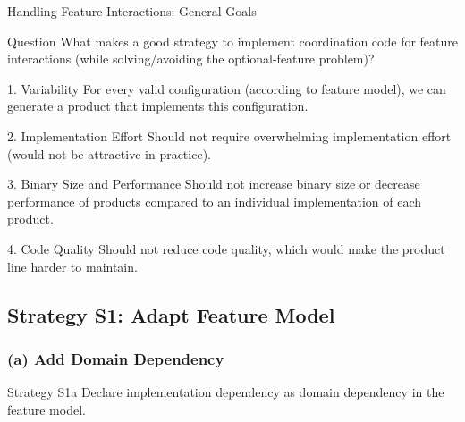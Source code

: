 \begin{frame}{Handling Feature Interactions: General Goals}
	\begin{note}{Question}
		What makes a good strategy to implement coordination code for feature interactions (while solving/avoiding the optional-feature problem)?
	\end{note}
	\pause
	\begin{fancycolumns}[animation=none]
		\begin{definition}{1. Variability}
			For every valid configuration (according to feature model), we can generate a product that implements this configuration.
		\end{definition}
		\pause
		\begin{definition}{2. Implementation Effort}
			Should not require overwhelming implementation effort (would not be attractive in practice).
		\end{definition}
		\pause
	\nextcolumn
		\begin{definition}{3. Binary Size and Performance}
			Should not increase binary size or decrease performance of products compared to an individual implementation of each product.
		\end{definition}
		\pause
		\begin{definition}{4. Code Quality}
			Should not reduce code quality, which would make the product line harder to maintain. 
		\end{definition}
	\end{fancycolumns}
\end{frame}

\subsection{Strategy S1: Adapt Feature Model}

\subsubsection*{(a) Add Domain Dependency}
\begin{frame}{\myframetitle}
	\begin{fancycolumns}[widths={30},animation=none]
		\begin{definition}{Strategy S1a}
			Declare implementation dependency as domain dependency in the feature model.
		\end{definition}
	\nextcolumn
	\end{fancycolumns}
\end{frame}

